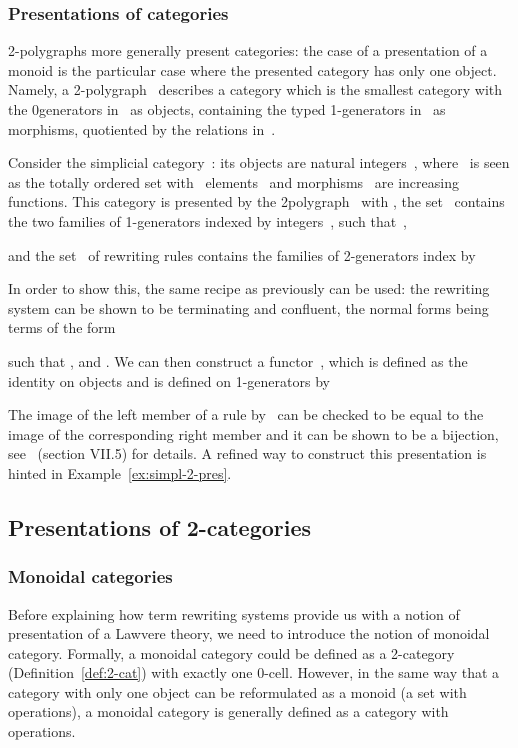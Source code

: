 \documentclass{LMCS}
\begin{document}
\subsubsection{Presentations of categories}
2-polygraphs more generally present categories: the case of a presentation of a
monoid is the particular case where the presented category has only one
object. Namely, a 2-polygraph~ describes a category which is the smallest
category with the 0\nbd{}generators in~ as objects, containing the typed
1-generators in~ as morphisms, quotiented by the relations in~.

\begin{exa}
  \label{ex:pres-delta-cat}
  Consider the simplicial category~: its objects are natural
  integers~, where~ is seen as the totally ordered set with~
  elements~ and morphisms~ are increasing
  functions. This category is presented by the 2\nbd{}polygraph~ with
  , the set~ contains the two families of 1-generators indexed by
  integers~\hbox{}, such that~,
  
  and the set~ of rewriting rules contains the families of 2-generators
  index by 
  
  In order to show this, the same recipe as previously can be used: the
  rewriting system can be shown to be terminating and confluent, the normal
  forms being terms of the form
  
  such that ,  and . We
  can then construct a functor~, which is defined as
  the identity on objects and is defined on 1-generators by
  
  The image of the left member of a rule by~ can be checked to be equal to
  the image of the corresponding right member and it can be shown to be a
  bijection, see~\cite{maclane:cwm} (section VII.5) for details. A refined way
  to construct this presentation is hinted in Example~\ref{ex:simpl-2-pres}.
\end{exa}

\subsection{Presentations of 2-categories}
\subsubsection{Monoidal categories}
Before explaining how term rewriting systems provide us with a notion of
presentation of a Lawvere theory, we need to introduce the notion of monoidal
category. Formally, a monoidal category could be defined as a 2-category
(Definition~\ref{def:2-cat}) with exactly one 0-cell. However, in the same way
that a category with only one object can be reformulated as a monoid (\ie a set
with operations), a monoidal category is generally defined as a category with
operations.
\end{document}
